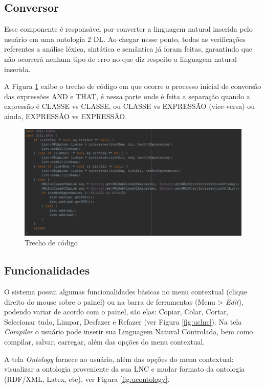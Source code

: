 \documentclass{bcc}
\begin{document}
\subsection{Conversor}

Esse componente é responsável por converter a linguagem natural inserida pelo usuário em uma ontologia 2 DL. Ao chegar nesse ponto, todas as verificações referentes a análise léxica, sintática e semântica já foram feitas, garantindo que não ocorrerá nenhum tipo de erro no que diz respeito a linguagem natural inserida.

A Figura \ref{fig:codigoConversor} exibe o trecho de código em que ocorre o processo inicial de conversão das expressões AND e THAT, é nessa parte onde é feita a separação quando a expressão é CLASSE vs CLASSE, ou CLASSE vs EXPRESSÃO (vice-versa) ou ainda, EXPRESSÃO vs EXPRESSÃO.

\begin{figure}[H]
\centering
\includegraphics[width=.8\textwidth]{Figuras/codigo_conversor_andthat.png}
\caption{Trecho de código} 
\label{fig:codigoConversor}
\end{figure}

\subsection{Funcionalidades}
O sistema possui algumas funcionalidades básicas no menu contextual (clique direito do mouse sobre o painel) ou na barra de ferramentas (Menu > \textit{Edit}), podendo variar de acordo com o painel, são elas: Copiar, Colar, Cortar, Selecionar tudo, Limpar, Desfazer e Refazer (ver Figura \ref{fig:uclnc}). Na tela \textit{Compiler} o usuário pode inserir sua Linguagem Natural Controlada, bem como compilar, salvar, carregar,  além das opções do menu contextual. 

A tela \textit{Ontology} fornece ao usuário, além das opções do menu contextual: visualizar a ontologia proveniente da sua LNC e mudar formato da ontologia (RDF/XML, Latex, etc), ver Figura \ref{fig:ucontology}.
\end{document}
